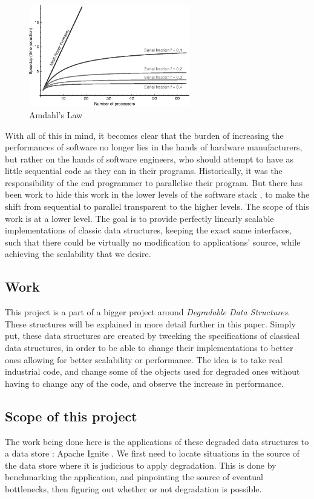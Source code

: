 \documentclass[conference]{IEEEtran}
\begin{document}
\begin{figure}[!ht]
\centerline{\includegraphics[width=70mm]{amdahl.png}}
\caption{Amdahl's Law}
\label{amdahl}
\end{figure}

With all of this in mind, it becomes clear that the burden of increasing the performances of software no longer lies in the hands of hardware manufacturers, but rather on the hands of software engineers, who should attempt to have as little sequential code as they can in their programs.
Historically, it was the responsibility of the end programmer to parallelise their program. But there has been work to hide this work in the lower levels of the software stack \cite{scalable}, to make the shift from sequential to parallel transparent to the higher levels. The scope of this work is at a lower level. The goal is to provide perfectly linearly scalable implementations of classic data structures, keeping the exact same interfaces, such that there could be virtually no modification to applications' source, while achieving the scalability that we desire.


\subsection{Work}
This project is a part of a bigger project around \textit{Degradable Data Structures}. These structures will be explained in more detail further in this paper. Simply put, these data structures are created by tweeking the specifications of classical data structures, in order to be able to change their implementations to better ones allowing for better scalability or performance. The idea is to take real industrial code, and change some of the objects used for degraded ones without having to change any of the code, and observe the increase in performance.

\subsection{Scope of this project}
The work being done here is the applications of these degraded data structures to a data store : Apache Ignite \cite{ignite}. We first need to locate situations in the source of the data store where it is judicious to apply degradation. This is done by benchmarking the application, and pinpointing the source of eventual bottlenecks, then figuring out whether or not degradation is possible.
\end{document}
